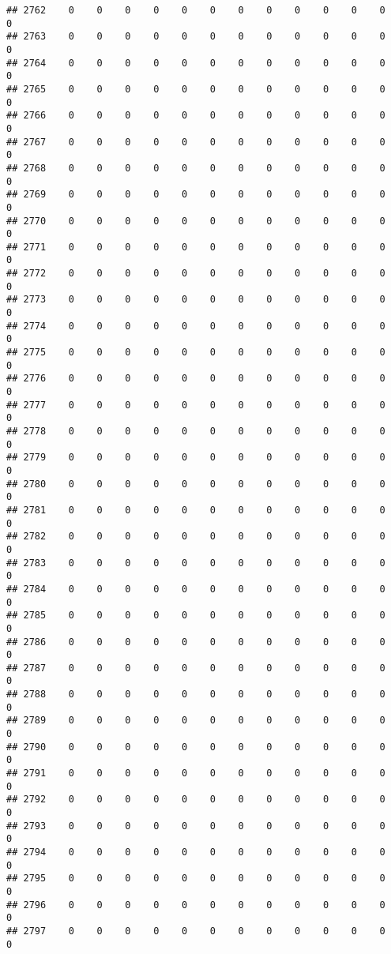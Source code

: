 \documentclass[]{article}
\begin{document}
\begin{verbatim}
## 2762    0    0    0    0    0    0    0    0    0    0    0    0    0
## 2763    0    0    0    0    0    0    0    0    0    0    0    0    0
## 2764    0    0    0    0    0    0    0    0    0    0    0    0    0
## 2765    0    0    0    0    0    0    0    0    0    0    0    0    0
## 2766    0    0    0    0    0    0    0    0    0    0    0    0    0
## 2767    0    0    0    0    0    0    0    0    0    0    0    0    0
## 2768    0    0    0    0    0    0    0    0    0    0    0    0    0
## 2769    0    0    0    0    0    0    0    0    0    0    0    0    0
## 2770    0    0    0    0    0    0    0    0    0    0    0    0    0
## 2771    0    0    0    0    0    0    0    0    0    0    0    0    0
## 2772    0    0    0    0    0    0    0    0    0    0    0    0    0
## 2773    0    0    0    0    0    0    0    0    0    0    0    0    0
## 2774    0    0    0    0    0    0    0    0    0    0    0    0    0
## 2775    0    0    0    0    0    0    0    0    0    0    0    0    0
## 2776    0    0    0    0    0    0    0    0    0    0    0    0    0
## 2777    0    0    0    0    0    0    0    0    0    0    0    0    0
## 2778    0    0    0    0    0    0    0    0    0    0    0    0    0
## 2779    0    0    0    0    0    0    0    0    0    0    0    0    0
## 2780    0    0    0    0    0    0    0    0    0    0    0    0    0
## 2781    0    0    0    0    0    0    0    0    0    0    0    0    0
## 2782    0    0    0    0    0    0    0    0    0    0    0    0    0
## 2783    0    0    0    0    0    0    0    0    0    0    0    0    0
## 2784    0    0    0    0    0    0    0    0    0    0    0    0    0
## 2785    0    0    0    0    0    0    0    0    0    0    0    0    0
## 2786    0    0    0    0    0    0    0    0    0    0    0    0    0
## 2787    0    0    0    0    0    0    0    0    0    0    0    0    0
## 2788    0    0    0    0    0    0    0    0    0    0    0    0    0
## 2789    0    0    0    0    0    0    0    0    0    0    0    0    0
## 2790    0    0    0    0    0    0    0    0    0    0    0    0    0
## 2791    0    0    0    0    0    0    0    0    0    0    0    0    0
## 2792    0    0    0    0    0    0    0    0    0    0    0    0    0
## 2793    0    0    0    0    0    0    0    0    0    0    0    0    0
## 2794    0    0    0    0    0    0    0    0    0    0    0    0    0
## 2795    0    0    0    0    0    0    0    0    0    0    0    0    0
## 2796    0    0    0    0    0    0    0    0    0    0    0    0    0
## 2797    0    0    0    0    0    0    0    0    0    0    0    0    0

\end{verbatim}
\end{document}
